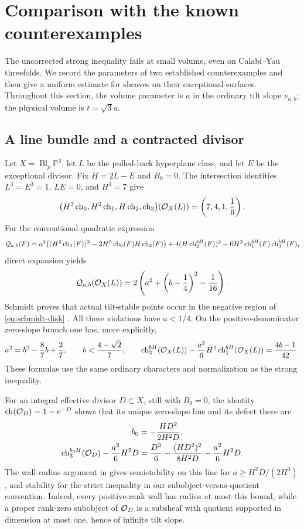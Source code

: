 \section{Comparison with the known counterexamples}
\label{sec:counterexamples}

The uncorrected strong inequality fails at small volume, even on
Calabi--Yau threefolds.  We record the parameters of two established
counterexamples and then give a uniform estimate for sheaves on their
exceptional surfaces.  Throughout this section, the volume parameter is
\(a\) in the ordinary tilt slope \(\nu_{a,b}\); the physical volume is
\(t=\sqrt3a\).

\subsection{A line bundle and a contracted divisor}

Let \(X=\operatorname{Bl}_p\mathbb P^3\), let \(L\) be the pulled-back
hyperplane class, and let \(E\) be the exceptional divisor.  Fix
\(H=2L-E\) and \(B_0=0\).  The intersection identities
\(L^3=E^3=1\), \(LE=0\), and \(H^3=7\) give
\[
 \bigl(H^3\operatorname{ch}_0,H^2\operatorname{ch}_1,H\operatorname{ch}_2,\operatorname{ch}_3\bigr)(\mathcal O_X(L))
 =\left(7,4,1,\frac16\right).
\]
For the conventional quadratic expression
\[
 \mathcal Q_{a,b}(F)
 =a^2\bigl((H^2\operatorname{ch}_1(F))^2-2H^3\operatorname{ch}_0(F)H\operatorname{ch}_2(F)\bigr)
  +4(H\operatorname{ch}_2^{bH}(F))^2
  -6H^2\operatorname{ch}_1^{bH}(F)\operatorname{ch}_3^{bH}(F),
\]
direct expansion yields
\begin{equation}
 \mathcal Q_{a,b}(\mathcal O_X(L))
 =2\left(a^2+\left(b-\frac14\right)^2-\frac1{16}\right).
 \label{eq:schmidt-disk}
\end{equation}
Schmidt proves that actual tilt-stable points occur in the negative
region of \eqref{eq:schmidt-disk}
\cite[Theorem~3.1]{Schmidt2017}.  All these violations have \(a<1/4\).
On the positive-denominator zero-slope branch one has, more explicitly,
\[
 a^2=b^2-\frac87b+\frac27,
 \qquad b<\frac{4-\sqrt2}{7},
 \qquad
 \operatorname{ch}_3^{bH}(\mathcal O_X(L))
 -\frac{a^2}{6}H^2\operatorname{ch}_1^{bH}(\mathcal O_X(L))
 =\frac{4b-1}{42}.
\]
These formulas use the same ordinary characters and normalization as
the strong inequality.

For an integral effective divisor \(D\subset X\), still with \(B_0=0\),
the identity \(\operatorname{ch}(\mathcal O_D)=1-e^{-D}\) shows that its unique zero-slope
line and its defect there are
\begin{align}
 b_0&=-\frac{HD^2}{2H^2D},\notag\\
 \operatorname{ch}_3^{b_0H}(\mathcal O_D)
 -\frac{a^2}{6}H^2D
 &=\frac{D^3}{6}
   -\frac{(HD^2)^2}{8H^2D}
   -\frac{a^2}{6}H^2D.
 \label{eq:divisor-counterexample}
\end{align}
The wall-radius argument in
\cite[Lemma~3.1 and its proof]{MartinezSchmidt2019} gives semistability
on this line for \(a\ge H^2D/(2H^3)\), and stability for the strict
inequality in our subobject-versus-quotient convention.  Indeed, every
positive-rank wall has radius at most this bound, while a proper
rank-zero subobject of \(\mathcal O_D\) is a subsheaf with quotient supported
in dimension at most one, hence of infinite tilt slope.


